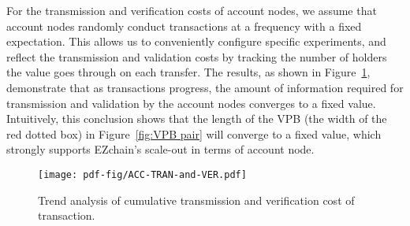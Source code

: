 \documentclass[conference]{IEEEtran}
\begin{document}
For the transmission and verification costs of account nodes, we assume that account nodes randomly conduct transactions at a frequency with a fixed expectation. This allows us to conveniently configure specific experiments, and reflect the transmission and validation costs by tracking the number of holders the value goes through on each transfer. The results, as shown in Figure~\ref{fig: ex Storage and verification cost acc 3}, demonstrate that as transactions progress, the amount of information required for transmission and validation by the account nodes converges to a fixed value. Intuitively, this conclusion shows that the length of the VPB (the width of the red dotted box) in Figure~\ref{fig:VPB pair} will converge to a fixed value, which strongly supports EZchain's scale-out in terms of account node.

\begin{figure}[htp!]
    \centering
    \texttt{[image: pdf-fig/ACC-TRAN-and-VER.pdf]}
    \caption{Trend analysis of cumulative transmission and verification cost of transaction.}
    \label{fig: ex Storage and verification cost acc 3}
\end{figure}
\end{document}
